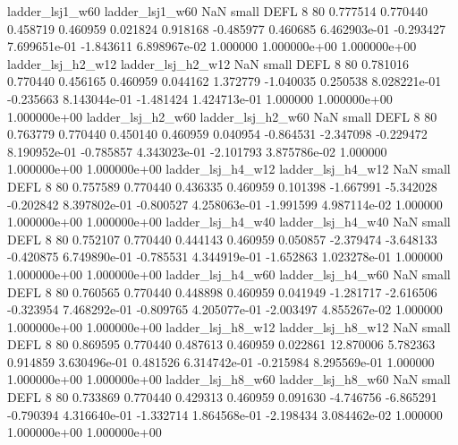          ladder_lsj1_w60          ladder_lsj1_w60                   NaN      small     DEFL                 8 80 0.777514       0.770440 0.458719       0.460959    0.021824      0.918168     -0.485977     0.460685   6.462903e-01 -0.293427 7.699651e-01    -1.843611   6.898967e-02            1.000000    1.000000e+00        1.000000e+00
       ladder_lsj_h2_w12        ladder_lsj_h2_w12                   NaN      small     DEFL                 8 80 0.781016       0.770440 0.456165       0.460959    0.044162      1.372779     -1.040035     0.250538   8.028221e-01 -0.235663 8.143044e-01    -1.481424   1.424713e-01            1.000000    1.000000e+00        1.000000e+00
       ladder_lsj_h2_w60        ladder_lsj_h2_w60                   NaN      small     DEFL                 8 80 0.763779       0.770440 0.450140       0.460959    0.040954     -0.864531     -2.347098    -0.229472   8.190952e-01 -0.785857 4.343023e-01    -2.101793   3.875786e-02            1.000000    1.000000e+00        1.000000e+00
       ladder_lsj_h4_w12        ladder_lsj_h4_w12                   NaN      small     DEFL                 8 80 0.757589       0.770440 0.436335       0.460959    0.101398     -1.667991     -5.342028    -0.202842   8.397802e-01 -0.800527 4.258063e-01    -1.991599   4.987114e-02            1.000000    1.000000e+00        1.000000e+00
       ladder_lsj_h4_w40        ladder_lsj_h4_w40                   NaN      small     DEFL                 8 80 0.752107       0.770440 0.444143       0.460959    0.050857     -2.379474     -3.648133    -0.420875   6.749890e-01 -0.785531 4.344919e-01    -1.652863   1.023278e-01            1.000000    1.000000e+00        1.000000e+00
       ladder_lsj_h4_w60        ladder_lsj_h4_w60                   NaN      small     DEFL                 8 80 0.760565       0.770440 0.448898       0.460959    0.041949     -1.281717     -2.616506    -0.323954   7.468292e-01 -0.809765 4.205077e-01    -2.003497   4.855267e-02            1.000000    1.000000e+00        1.000000e+00
       ladder_lsj_h8_w12        ladder_lsj_h8_w12                   NaN      small     DEFL                 8 80 0.869595       0.770440 0.487613       0.460959    0.022861     12.870006      5.782363     0.914859   3.630496e-01  0.481526 6.314742e-01    -0.215984   8.295569e-01            1.000000    1.000000e+00        1.000000e+00
       ladder_lsj_h8_w60        ladder_lsj_h8_w60                   NaN      small     DEFL                 8 80 0.733869       0.770440 0.429313       0.460959    0.091630     -4.746756     -6.865291    -0.790394   4.316640e-01 -1.332714 1.864568e-01    -2.198434   3.084462e-02            1.000000    1.000000e+00        1.000000e+00
